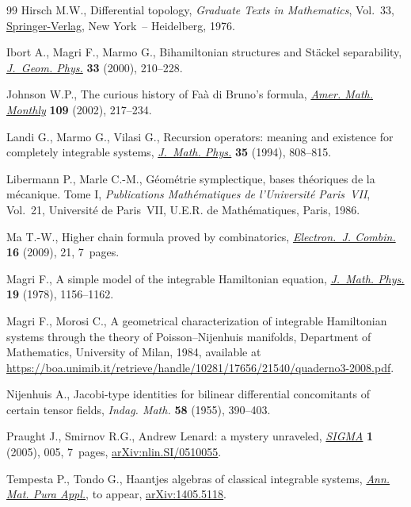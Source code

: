 \begin{thebibliography}{99}
Hirsch M.W., Differential topology, \textit{Graduate Texts in Mathematics},
 Vol.~33, \href{https://doi.org/10.1007/978-1-4684-9449-5}{Springer-Verlag}, New York~-- Heidelberg, 1976.

Ibort A., Magri F., Marmo G., Bihamiltonian structures and {S}t\"ackel
 separability, \href{https://doi.org/10.1016/S0393-0440(99)00051-0}{\textit{J.~Geom. Phys.}} \textbf{33} (2000), 210--228.

Johnson W.P., The curious history of {F}a\`a di {B}runo's formula,
 \href{https://doi.org/10.2307/2695352}{\textit{Amer. Math. Monthly}} \textbf{109} (2002), 217--234.

Landi G., Marmo G., Vilasi G., Recursion operators: meaning and existence for
 completely integrable systems, \href{https://doi.org/10.1063/1.530613}{\textit{J.~Math. Phys.}} \textbf{35} (1994),
 808--815.

Libermann P., Marle C.-M., G\'eom\'etrie symplectique, bases th\'eoriques de la
 m\'ecanique. {T}ome {I}, \textit{Publications Math\'ematiques de
 l'Universit\'e Paris~VII}, Vol.~21, Universit\'e de Paris~VII, U.E.R. de
 Math\'ematiques, Paris, 1986.

Ma T.-W., Higher chain formula proved by combinatorics, \href{https://doi.org/10.37236/259}{\textit{Electron.~J.
 Combin.}} \textbf{16} (2009), 21, 7~pages.

Magri F., A simple model of the integrable {H}amiltonian equation,
 \href{https://doi.org/10.1063/1.523777}{\textit{J.~Math. Phys.}} \textbf{19} (1978), 1156--1162.

Magri F., Morosi C., A geometrical characterization of integrable {H}amiltonian
 systems through the theory of {P}oisson--{N}ijenhuis manifolds, {D}epartment
 of Mathematics, University of Milan, 1984, available at
 \url{https://boa.unimib.it/retrieve/handle/10281/17656/21540/quaderno3-2008.pdf}.

Nijenhuis A., Jacobi-type identities for bilinear differential concomitants of
 certain tensor fields, \textit{Indag. Math.} \textbf{58} (1955), 390--403.

Praught J., Smirnov R.G., Andrew {L}enard: a mystery unraveled, \href{https://doi.org/10.3842/SIGMA.2005.005}{\textit{SIGMA}}
 \textbf{1} (2005), 005, 7~pages, \href{https://arxiv.org/abs/nlin.SI/0510055}{arXiv:nlin.SI/0510055}.

Tempesta P., Tondo G., Haantjes algebras of classical integrable systems,
 \href{https://doi.org/10.1007/s10231-021-01107-4}{\textit{Ann. Mat. Pura Appl.}}, {t}o appear, \href{https://arxiv.org/abs/1405.5118}{arXiv:1405.5118}.

\end{thebibliography}
